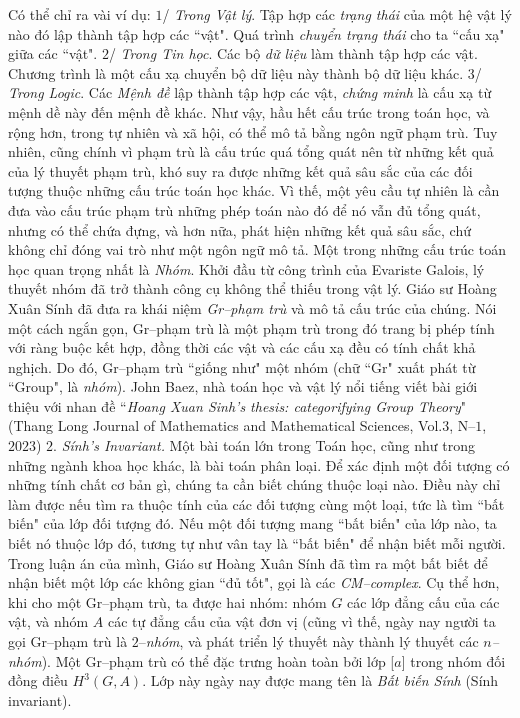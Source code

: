 \begin{multicols}{2}
	Có thể chỉ ra vài ví dụ:
	\vskip 0.1cm
	$1$/ \textit{Trong Vật lý}. Tập hợp các \textit{trạng thái} của một  hệ vật lý nào đó lập thành tập hợp các ``vật". Quá trình \textit{chuyển trạng thái} cho ta ``cấu xạ" giữa các ``vật".
	\vskip 0.1cm
	$2$/ \textit{Trong Tin học}. Các bộ \textit{dữ liệu} làm thành tập hợp các vật. Chương trình là một cấu xạ chuyển bộ dữ liệu này thành bộ dữ liệu khác.
	\vskip 0.1cm
	$3$/ \textit{Trong Logic}. Các \textit{Mệnh đề} lập thành tập hợp các vật, \textit{chứng minh} là cấu xạ từ mệnh dề này đến mệnh đề khác.
	\vskip 0.1cm
	Như vậy, hầu hết cấu trúc trong toán học, và rộng hơn, trong tự nhiên và xã hội, có thể mô tả bằng ngôn ngữ phạm trù. Tuy nhiên, cũng chính vì phạm trù là cấu trúc quá tổng quát nên từ những kết quả của lý thuyết phạm trù, khó suy ra được những kết quả sâu sắc của các đối tượng thuộc những cấu trúc toán học khác. Vì thế, một yêu cầu tự nhiên là cần đưa vào cấu trúc phạm trù những phép toán nào đó để nó vẫn đủ tổng quát, nhưng có thể chứa đựng, và hơn nữa,  phát hiện những kết quả sâu sắc, chứ không chỉ đóng vai trò như một ngôn ngữ mô tả.
	\vskip 0.1cm
	Một trong những cấu trúc toán học quan trọng nhất là \textit{Nhóm}. Khởi đầu từ công trình của Evariste Galois, lý thuyết nhóm đã trở thành công cụ không thể thiếu trong vật lý. Giáo sư Hoàng Xuân Sính đã đưa ra khái niệm \textit{Gr--phạm trù} và mô tả cấu trúc của chúng. Nói một cách ngắn gọn,  Gr--phạm trù là một phạm trù trong đó trang bị phép tính với ràng buộc kết hợp, đồng thời các vật và các cấu xạ đều có tính chất khả nghịch. Do đó, Gr--phạm trù ``giống như" một nhóm (chữ ``Gr" xuất phát từ ``Group", là \textit{nhóm}). John Baez, nhà toán học và vật lý nổi tiếng viết bài giới thiệu với nhan đề ``\textit{Hoang Xuan Sinh’s thesis: categorifying Group Theory}" (Thang Long Journal of Mathematics and Mathematical Sciences, Vol.$3$, N--$1$, $2023$)
	\vskip 0.1cm
	$2$. \textit{Sính's Invariant.}
	\vskip 0.1cm
	Một bài toán lớn trong Toán học, cũng như trong những ngành khoa học khác, là bài toán phân loại. Để xác định một đối tượng có những tính chất cơ bản gì, chúng ta cần biết chúng thuộc loại nào. Điều này chỉ làm được nếu tìm ra thuộc tính của các đối tượng cùng một  loại, tức là tìm ``bất biến" của lớp đối tượng đó. Nếu một đối tượng mang ``bất biến" của lớp nào, ta biết nó thuộc lớp đó,  tương tự như vân tay là ``bất biến" để nhận biết mỗi người.
	\vskip 0.1cm
	Trong luận án của mình, Giáo sư Hoàng Xuân Sính đã tìm ra một bất biết để nhận biết một lớp các không gian ``đủ tốt", gọi là các \textit{CM--complex}. Cụ thể hơn, khi cho một Gr--phạm trù, ta được hai nhóm: nhóm $G$ các lớp đẳng cấu của các vật, và nhóm $A$ các tự đẳng cấu của vật đơn vị (cũng vì thế, ngày nay người ta gọi Gr--phạm trù là $2$--\textit{nhóm}, và phát triển lý thuyết này thành lý thuyết các \textit{$n$--nhóm}). Một Gr--phạm trù có thể đặc trưng hoàn toàn bởi lớp [$a$] trong nhóm đối đồng điều $H^3(G, A)$. Lớp này ngày nay được mang tên là \textit{Bất biến Sính} (Sính invariant).

\end{multicols}
